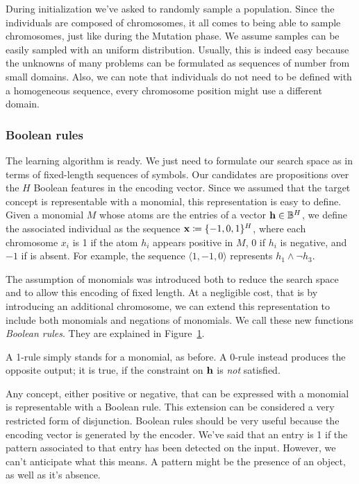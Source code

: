 During initialization we've asked to randomly sample a population. Since the
individuals are composed of chromosomes, it all comes to being able to sample
chromosomes, just like during the Mutation phase. We assume samples can be
easily sampled with an uniform distribution. Usually, this is indeed easy
because the unknowns of many problems can be formulated as sequences of number
from small domains. Also, we can note that individuals do not need to be
defined with a homogeneous sequence, every chromosome position might use a
different domain.


\subsubsection{Boolean rules}

The learning algorithm is ready. We just need to formulate our search space as
in terms of fixed-length sequences of symbols. Our candidates are propositions
over the $H$ Boolean features in the encoding vector. Since we assumed that
the target concept is representable with a monomial, this representation is
easy to define. Given a monomial $M$ whose atoms are the entries of a vector
$\bh \in \B^H$, we define the associated individual as the sequence $\x
\coloneqq \set{-1, 0, 1}^H$, where each chromosome $x_i$ is 1 if the atom
$h_i$ appears positive in $M$, 0 if $h_i$ is negative, and $-1$ if is absent.
For example, the sequence $\langle 1, -1, 0 \rangle$ represents $h_1 \land
\lnot h_3$.

The assumption of monomials was introduced both to reduce the search space and
to allow this encoding of fixed length. At a negligible cost, that is by
introducing an additional chromosome, we can extend this representation to
include both monomials and negations of monomials. We call these new functions
\emph{Boolean rules}. They are explained in Figure~\ref{fig:boolean-rules}.
\begin{figure}
	\centering
	\begin{tikzpicture}
	\end{tikzpicture}
	\caption{} %
	\label{fig:boolean-rules}
\end{figure}
A 1-rule simply stands for a monomial, as before. A 0-rule instead produces
the opposite output; it is true, if the constraint on $\bh$ is \emph{not}
satisfied.

Any concept, either positive or negative, that can be expressed with a
monomial is representable with a Boolean rule. This extension can be
considered a very restricted form of disjunction. Boolean rules should be very
useful because the encoding vector is generated by the encoder. We've said
that an entry is 1 if the pattern associated to that entry has been detected
on the input. However, we can't anticipate what this means. A pattern might be
the presence of an object, as well as it's absence.

